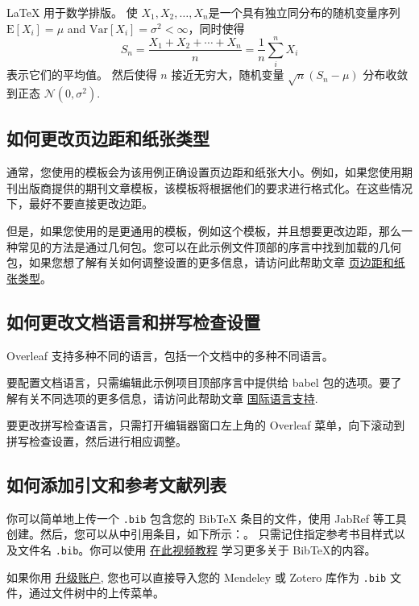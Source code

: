 \documentclass{article}
\begin{document}
\LaTeX{} 用于数学排版。
使 $X_1, X_2,\ldots,X_n$是一个具有独立同分布的随机变量序列 $\text{E}[X_i] = \mu$ and  $\text{Var}[X_i] = \sigma^2 < \infty$，同时使得
\[S_n = \frac{X_1 + X_2 + \cdots + X_n}{n}
      = \frac{1}{n}\sum_{i}^{n} X_i\]
表示它们的平均值。 然后使得 $n$ 接近无穷大，随机变量 $\sqrt{n}(S_n - \mu)$ 分布收敛到正态 $\mathcal{N}(0, \sigma^2)$.

\subsection{如何更改页边距和纸张类型}

通常，您使用的模板会为该用例正确设置页边距和纸张大小。例如，如果您使用期刊出版商提供的期刊文章模板，该模板将根据他们的要求进行格式化。在这些情况下，最好不要直接更改边距。

但是，如果您使用的是更通用的模板，例如这个模板，并且想要更改边距，那么一种常见的方法是通过几何包。您可以在此示例文件顶部的序言中找到加载的几何包，如果您想了解有关如何调整设置的更多信息，请访问此帮助文章 \href{https://www.overleaf.com/learn/latex/page_size_and_margins}{页边距和纸张类型}。

\subsection{如何更改文档语言和拼写检查设置}

Overleaf 支持多种不同的语言，包括一个文档中的多种不同语言。

要配置文档语言，只需编辑此示例项目顶部序言中提供给 babel 包的选项。要了解有关不同选项的更多信息，请访问此帮助文章 \href{https://www.overleaf.com/learn/latex/International_language_support}{国际语言支持}.

要更改拼写检查语言，只需打开编辑器窗口左上角的 Overleaf 菜单，向下滚动到拼写检查设置，然后进行相应调整。

\subsection{如何添加引文和参考文献列表}

你可以简单地上传一个 \verb|.bib| 包含您的 BibTeX 条目的文件，使用 JabRef 等工具创建。然后，您可以从中引用条目，如下所示：\cite{01}。 只需记住指定参考书目样式以及文件名 \verb|.bib|。你可以使用 \href{https://www.overleaf.com/help/97-how-to-include-a-bibliography-using-bibtex}{在此视频教程} 学习更多关于 BibTeX的内容。

如果你用 \href{https://www.overleaf.com/user/subscription/plans}{升级账户}, 您也可以直接导入您的 Mendeley 或 Zotero 库作为 \verb|.bib| 文件，通过文件树中的上传菜单。
\end{document}
